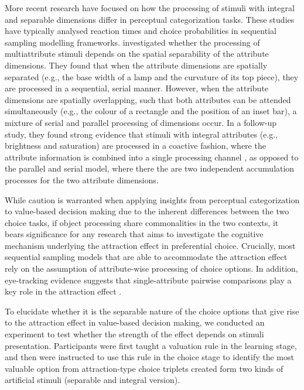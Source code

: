 \documentclass[11pt,a4paper]{article}
\begin{document}
More recent research have focused on how the processing of stimuli with integral and separable dimensions differ in perceptual categorization tasks. These studies have typically analysed reaction times and choice probabilities in sequential sampling modelling frameworks.  investigated whether the processing of multiattribute stimuli depends on the spatial separability of the attribute dimensions. They found that when the attribute dimensions are spatially separated (e.g., the base width of a lamp and the curvature of its top piece), they are processed in a sequential, serial manner. However, when the attribute dimensions are spatially overlapping, such that both attributes can be attended simultaneously (e.g., the colour of a rectangle and the position of an inset bar), a mixture of serial and parallel processing of dimensions occur. In a follow-up study, they found strong evidence that stimuli with integral attributes (e.g., brightness and saturation) are processed in a coactive fashion, where the attribute information is combined into a single processing channel \cite{Littleetal2013}, as opposed to the parallel and serial model, where there the are two independent accumulation processes for the two attribute dimensions.

While caution is warranted when applying insights from perceptual categorization to value-based decision making due to the inherent differences between the two choice tasks, if object processing share commonalities in the two contexts, it bears significance for any research that aims to investigate the cognitive mechanism underlying the attraction effect in preferential choice.   Crucially, most sequential sampling models that are able to accommodate the attraction effect rely on the assumption of attribute-wise processing of choice options. In addition, eye-tracking evidence suggests that single-attribute pairwise comparisons play a key role in the attraction effect \cite{Noguchi2014}.

To elucidate whether it is the separable nature of the choice options that give rise to the attraction effect in value-based decision making, we conducted an experiment to test whether the strength of the effect depends on stimuli presentation. Participants were first taught a valuation rule in the learning stage, and then were instructed to use this rule in the choice stage to identify the most valuable option from attraction-type choice triplets created form two kinds of artificial stimuli (separable and integral version). 
\end{document}
